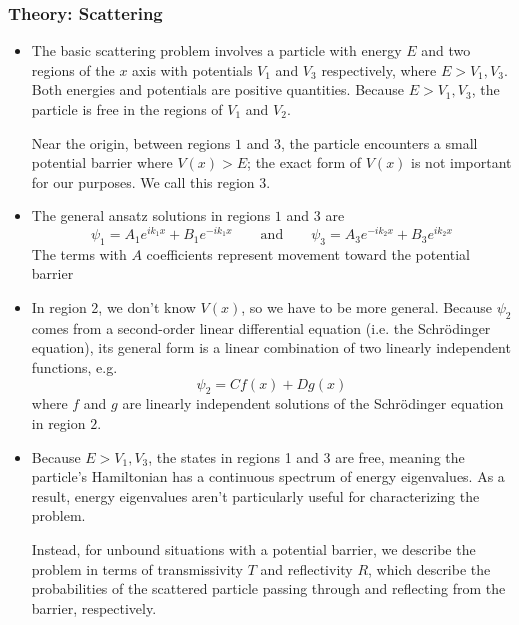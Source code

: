 \documentclass[11pt, a4paper]{article}
\newcommand{\eqtext}[1]{\qquad \text{#1} \qquad}
\newcommand{\schro}{Schr\"{o}dinger\xspace}
\begin{document}
\subsubsection{Theory: Scattering}
\begin{itemize}
	\item The basic scattering problem involves a particle with energy $ E $ and two regions of the $ x $ axis with potentials $ V_{1} $ and $ V_{3} $ respectively,  where $ E > V_{1}, V_{3} $. Both energies and potentials are positive quantities. Because $ E > V_{1}, V_{3} $, the particle is free in the regions of $ V_{1} $ and $ V_{2} $.
	
	Near the origin, between regions $ 1 $ and $ 3 $, the particle encounters a small potential barrier where $ V(x) > E $; the exact form of $ V(x) $ is not important for our purposes. We call this region $ 3 $. 
	
	\item The general ansatz solutions in regions $ 1 $ and $ 3 $ are
	\begin{equation*}
		\psi_{1} = A_{1} e^{ik_{1}x} + B_{1}e^{-ik_{1}x} \eqtext{and} \psi_{3} = A_{3} e^{-ik_{2}x} + B_{3}e^{ik_{2}x}
	\end{equation*}
	The terms with $ A $ coefficients represent movement toward the potential barrier 
	
	\item In region 2, we don't know $ V(x) $, so we have to be more general. Because $ \psi_{2} $ comes from a second-order linear differential equation (i.e. the \schro equation), its general form is a linear combination of two linearly independent functions, e.g.
	\begin{equation*}
		\psi_{2} = C f(x) + D g(x)
	\end{equation*}
	where $ f $ and $ g $ are linearly independent solutions of the \schro equation in region $ 2 $. 
	
	\item Because $ E > V_{1}, V_{3} $, the states in regions 1 and 3 are free, meaning the particle's Hamiltonian has a continuous spectrum of energy eigenvalues. As a result, energy eigenvalues aren't particularly useful for characterizing the problem. 
	
	Instead, for unbound situations with a potential barrier, we describe the problem in terms of transmissivity $ T $ and reflectivity $ R $, which describe the probabilities of the scattered particle passing through and reflecting from the barrier, respectively.
\end{itemize}
\end{document}
